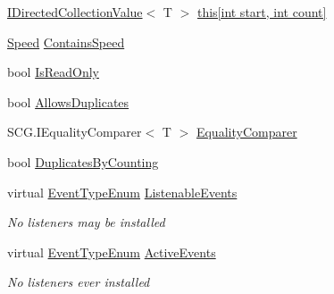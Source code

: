\begin{DoxyCompactItemize}
\item 
\hyperlink{interface_c5_1_1_i_directed_collection_value}{I\+Directed\+Collection\+Value}$<$ T $>$ \hyperlink{class_c5_1_1_wrapped_array_a791feb63e897935f737406895d0a4f98}{this\mbox{[}int start, int count\mbox{]}}
\item 
\hyperlink{namespace_c5_a615ba88dcdaa8d5a3c5f833a73d7fad6}{Speed} \hyperlink{class_c5_1_1_wrapped_array_a631563907120394f515e2ef7d70e60e2}{Contains\+Speed}
\item 
bool \hyperlink{class_c5_1_1_wrapped_array_ac494d49951b3285021ae35adfaa0da22}{Is\+Read\+Only}
\item 
bool \hyperlink{class_c5_1_1_wrapped_array_a8a9ef8c7d764f62ce2cfb3362ceb593a}{Allows\+Duplicates}
\item 
S\+C\+G.\+I\+Equality\+Comparer$<$ T $>$ \hyperlink{class_c5_1_1_wrapped_array_ad137487997743e41f5f6e56e4f0cdf53}{Equality\+Comparer}
\item 
bool \hyperlink{class_c5_1_1_wrapped_array_aac81b310cf57364283da912775316da8}{Duplicates\+By\+Counting}
\item 
virtual \hyperlink{namespace_c5_a9143bfd561fffa025d21561674758008}{Event\+Type\+Enum} \hyperlink{class_c5_1_1_wrapped_array_a7d4694e3b14728396280bad7b17052f4}{Listenable\+Events}
\begin{DoxyCompactList}\small\item\em No listeners may be installed \end{DoxyCompactList}\item 
virtual \hyperlink{namespace_c5_a9143bfd561fffa025d21561674758008}{Event\+Type\+Enum} \hyperlink{class_c5_1_1_wrapped_array_a6a2885adb750589e6cff16fca6f8f861}{Active\+Events}
\begin{DoxyCompactList}\small\item\em No listeners ever installed \end{DoxyCompactList}\item 

\end{DoxyCompactItemize}
